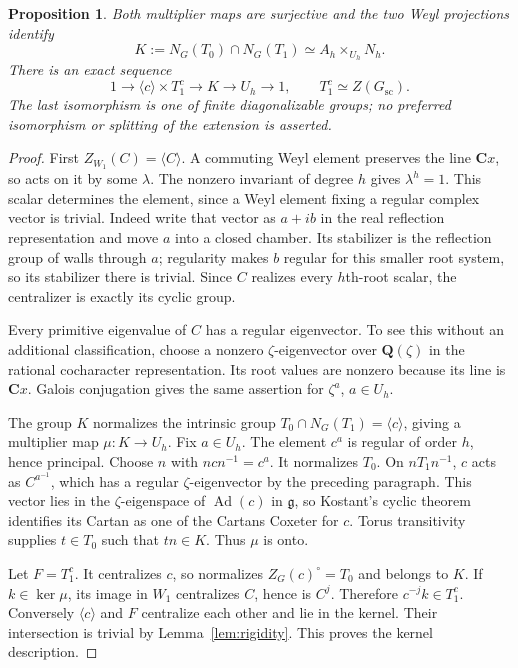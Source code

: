 \documentclass[11pt]{article}
\newcommand{\C}{\mathbf C}\newcommand{\Z}{\mathbf Z}\newcommand{\Q}{\mathbf Q}
\newcommand{\g}{\mathfrak g}\newcommand{\tfr}{\mathfrak t}
\newcommand{\Ad}{\operatorname{Ad}}\newcommand{\Aut}{\operatorname{Aut}}
\newtheorem{proposition}[theorem]{Proposition}
\theoremstyle{definition}\newtheorem{definition}[theorem]{Definition}
\theoremstyle{remark}\newtheorem{remark}[theorem]{Remark}
\begin{document}
\begin{proposition}\label{prop:normalizer}
Both multiplier maps are surjective and the two Weyl projections identify
\[
 K:=N_G(T_0)\cap N_G(T_1)\simeq A_h\times_{U_h}N_h.
\]
There is an exact sequence
\begin{equation}\label{eq:extension}
 1\longrightarrow\langle c\rangle\times T_1^c
 \longrightarrow K\longrightarrow U_h\longrightarrow1,
 \qquad T_1^c\simeq Z(G_{\mathrm{sc}}).
\end{equation}
The last isomorphism is one of finite diagonalizable groups; no preferred isomorphism or splitting of the extension is asserted.
\end{proposition}
\begin{proof}
First $Z_{W_1}(C)=\langle C\rangle$. A commuting Weyl element preserves the line $\C x$, so acts on it by some $\lambda$. The nonzero invariant of degree $h$ gives $\lambda^h=1$. This scalar determines the element, since a Weyl element fixing a regular complex vector is trivial. Indeed write that vector as $a+ib$ in the real reflection representation and move $a$ into a closed chamber. Its stabilizer is the reflection group of walls through $a$; regularity makes $b$ regular for this smaller root system, so its stabilizer there is trivial. Since $C$ realizes every $h$th-root scalar, the centralizer is exactly its cyclic group.

Every primitive eigenvalue of $C$ has a regular eigenvector. To see this without an additional classification, choose a nonzero $\zeta$-eigenvector over $\Q(\zeta)$ in the rational cocharacter representation. Its root values are nonzero because its line is $\C x$. Galois conjugation gives the same assertion for $\zeta^a$, $a\in U_h$.

The group $K$ normalizes the intrinsic group $T_0\cap N_G(T_1)=\langle c\rangle$, giving a multiplier map $\mu:K\to U_h$. Fix $a\in U_h$. The element $c^a$ is regular of order $h$, hence principal. Choose $n$ with $ncn^{-1}=c^a$. It normalizes $T_0$. On $nT_1n^{-1}$, $c$ acts as $C^{a^{-1}}$, which has a regular $\zeta$-eigenvector by the preceding paragraph. This vector lies in the $\zeta$-eigenspace of $\Ad(c)$ in $\g$, so Kostant's cyclic theorem identifies its Cartan as one of the Cartans Coxeter for $c$. Torus transitivity supplies $t\in T_0$ such that $tn\in K$. Thus $\mu$ is onto.

Let $F=T_1^c$. It centralizes $c$, so normalizes $Z_G(c)^\circ=T_0$ and belongs to $K$. If $k\in\ker\mu$, its image in $W_1$ centralizes $C$, hence is $C^j$. Therefore $c^{-j}k\in T_1^c$. Conversely $\langle c\rangle$ and $F$ centralize each other and lie in the kernel. Their intersection is trivial by Lemma~\ref{lem:rigidity}. This proves the kernel description.


\end{proof}
\end{document}
